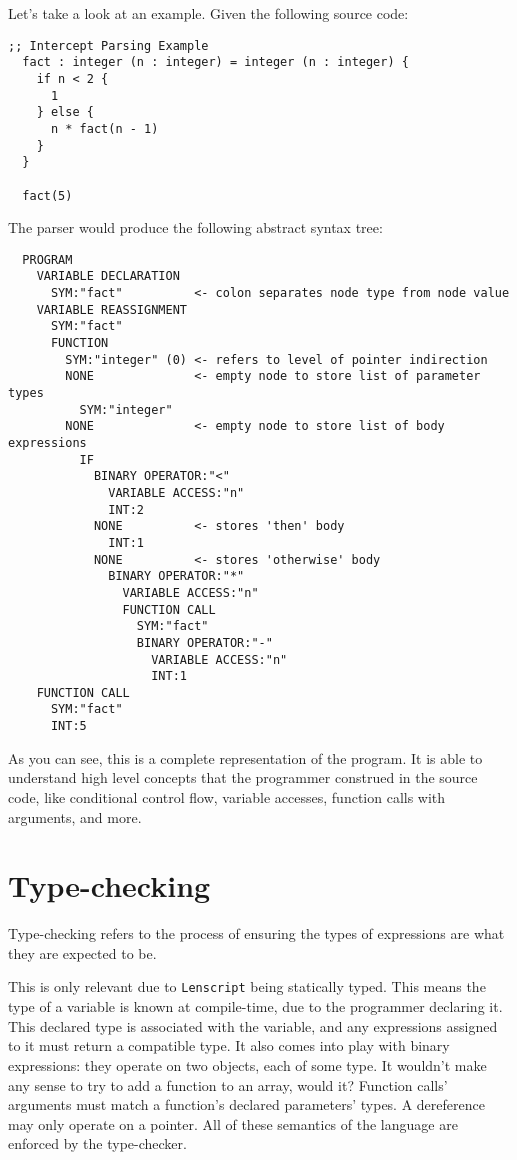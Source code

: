 \documentclass[12pt]{report}
\newcommand{\langname}{Lenscript}
\newcommand{\lang}{\texttt{\langname} }
\begin{document}
\begin{minipage}{\textwidth}

Let's take a look at an example. Given the following source code:
\begin{Verbatim}[samepage=true]
  ;; Intercept Parsing Example
  fact : integer (n : integer) = integer (n : integer) {
    if n < 2 {
      1
    } else {
      n * fact(n - 1)
    }
  }

  fact(5)
\end{Verbatim}

The parser would produce the following abstract syntax tree:
\begin{Verbatim}
  PROGRAM
    VARIABLE DECLARATION
      SYM:"fact"          <- colon separates node type from node value
    VARIABLE REASSIGNMENT
      SYM:"fact"
      FUNCTION
        SYM:"integer" (0) <- refers to level of pointer indirection
        NONE              <- empty node to store list of parameter types
          SYM:"integer"
        NONE              <- empty node to store list of body expressions
          IF
            BINARY OPERATOR:"<"
              VARIABLE ACCESS:"n"
              INT:2
            NONE          <- stores 'then' body
              INT:1
            NONE          <- stores 'otherwise' body
              BINARY OPERATOR:"*"
                VARIABLE ACCESS:"n"
                FUNCTION CALL
                  SYM:"fact"
                  BINARY OPERATOR:"-"
                    VARIABLE ACCESS:"n"
                    INT:1
    FUNCTION CALL
      SYM:"fact"
      INT:5
\end{Verbatim}

As you can see, this is a complete representation of the program. It is able to understand high level concepts that the programmer construed in the source code, like conditional control flow, variable accesses, function calls with arguments, and more.

\end{minipage}


\chapter{Type-checking}
\label{ch:typechecking}

Type-checking refers to the process of ensuring the types of expressions are what they are expected to be.

This is only relevant due to \lang being statically typed. This means the type of a variable is known at compile-time, due to the programmer declaring it. This declared type is associated with the variable, and any expressions assigned to it must return a compatible type. It also comes into play with binary expressions: they operate on two objects, each of some type. It wouldn't make any sense to try to add a function to an array, would it? Function calls' arguments must match a function's declared parameters' types. A dereference may only operate on a pointer. All of these semantics of the language are enforced by the type-checker.
\end{document}
